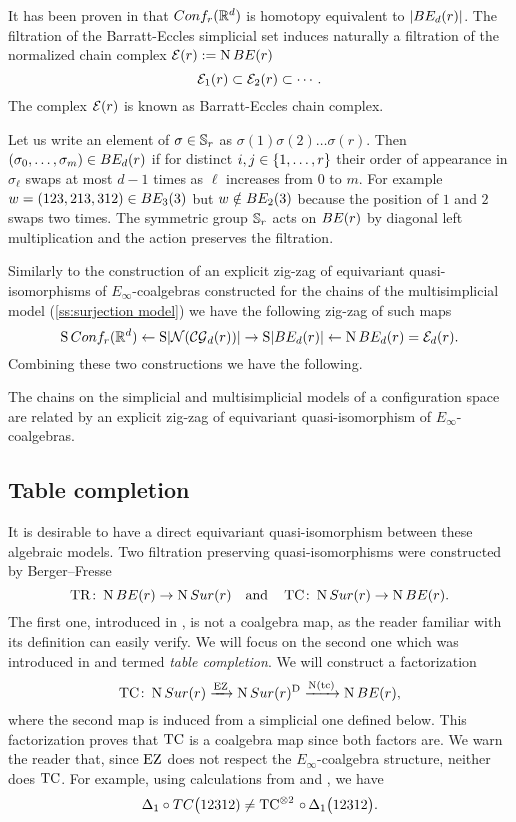 It has been proven in \cite{kashiwabara1993confcomplex} that $Conf_{r}(\mathbb{R}^d)$ is homotopy equivalent to $\lvert BE_{d}(r)\rvert $.
The filtration of the Barratt-Eccles simplicial set induces naturally a filtration of the normalized chain complex $\mathcal{E}(r):=\operatorname{N} BE(r)$
\[
\mathcal{E}_{1}(r) \subset \mathcal{E}_{2}(r) \subset \dotsb \,.
\]
The complex $\mathcal{E}(r)$ is known as Barratt-Eccles chain complex.

Let us write an element of $\sigma \in \mathbb{S}_r$ as $\sigma(1)\sigma(2) \dots \sigma(r)$.
Then $(\sigma_0,\dots,\sigma_m) \in BE_{d}(r)$ if for distinct $i,j \in \{1,\dots,r\}$ their order of appearance in $\sigma_\ell$ swaps at most $d-1$ times as $\ell$ increases from $0$ to $m$.
For example $w = (123,213,312) \in BE_{3}(3)$ but $w \notin BE_{2}(3)$ because the position of $1$ and $2$ swaps two times.
The symmetric group $\mathbb{S}_r$ acts on $BE(r)$ by diagonal left multiplication and the action preserves the filtration.

Similarly to the construction of an explicit zig-zag of equivariant quasi-isomorphisms of $E_\infty$-coalgebras constructed for the chains of the multisimplicial model (\cref{ss:surjection model}) we have the following zig-zag of such maps
\[
\operatorname{S}Conf_{r}(\mathbb{R}^d) \leftarrow \operatorname{S} \lvert\mathcal{N}(\mathcal{CG}_{d}(r))\rvert \to \operatorname{S}\lvert BE_{d}(r)\rvert \leftarrow \operatorname{N} BE_{d}(r) = \mathcal{E}_d(r).
\]
Combining these two constructions we have the following.
\begin{theorem}
	The chains on the simplicial and multisimplicial models of a configuration space are related by an explicit zig-zag of equivariant quasi-isomorphism of $E_\infty$-coalgebras.
\end{theorem}

\subsection{Table completion}\label{ss:table completion}

It is desirable to have a direct equivariant quasi-isomorphism between these algebraic models.
Two filtration preserving quasi-isomorphisms were constructed by Berger--Fresse
\[
\operatorname{TR} \colon \operatorname{N}BE(r) \to \operatorname{N}Sur(r)
\quad \text{and} \quad
\operatorname{TC} \colon \operatorname{N}Sur(r) \to \operatorname{N} BE(r).
\]
The first one, introduced in \cite[1$\cdot$3]{berger2004combinatorial}, is not a coalgebra map, as the reader familiar with its definition can easily verify.
We will focus on the second one which was introduced in \cite{berger2002prismatic} and termed \textit{table completion}.
We will construct a factorization
\[
\operatorname{TC} \colon \operatorname{N}Sur(r) \xrightarrow{\operatorname{EZ}} \operatorname{N}Sur(r)^{\mathrm{D}} \xrightarrow{\operatorname{N}(\operatorname{tc})} \operatorname{N} BE(r),
\]
where the second map is induced from a simplicial one defined below.
This factorization proves that $\operatorname{TC}$ is a coalgebra map since both factors are.
We warn the reader that, since $\operatorname{EZ}$ does not respect the $E_\infty$-coalgebra structure,
neither does $\operatorname{TC}$.
For example, using calculations from \cite{medina2022cube_einfty} and \cite{berger2002prismatic}, we have
\[
\Delta_1 \circ TC\big(12312) \neq
\operatorname{TC} ^{\otimes 2}\, \circ \, \Delta_1\big(12312\big).
\]


